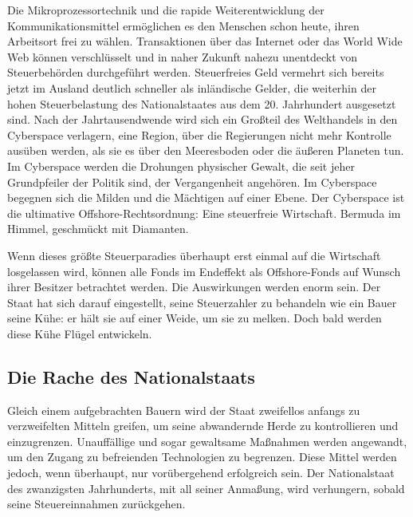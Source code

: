 \documentclass[
  a5paper,
  smalldemyvopaper,10pt,twoside,onecolumn,openright,extrafontsizes,hidelinks]{memoir}
\begin{document}
Die Mikroprozessortechnik und die rapide Weiterentwicklung der
Kommunikationsmittel ermöglichen es den Menschen schon heute, ihren
Arbeitsort frei zu wählen. Transaktionen über das Internet oder das
World Wide Web können verschlüsselt und in naher Zukunft nahezu
unentdeckt von Steuerbehörden durchgeführt werden. Steuerfreies Geld
vermehrt sich bereits jetzt im Ausland deutlich schneller als
inländische Gelder, die weiterhin der hohen Steuerbelastung des
Nationalstaates aus dem 20. Jahrhundert ausgesetzt sind. Nach der
Jahrtausendwende wird sich ein Großteil des Welthandels in den
Cyberspace verlagern, eine Region, über die Regierungen nicht mehr
Kontrolle ausüben werden, als sie es über den Meeresboden oder die
äußeren Planeten tun. Im Cyberspace werden die Drohungen physischer
Gewalt, die seit jeher Grundpfeiler der Politik sind, der Vergangenheit
angehören. Im Cyberspace begegnen sich die Milden und die Mächtigen auf
einer Ebene. Der Cyberspace ist die ultimative Offshore-Rechtsordnung:
Eine steuerfreie Wirtschaft. Bermuda im Himmel, geschmückt mit
Diamanten.

Wenn dieses größte Steuerparadies überhaupt erst einmal auf die
Wirtschaft losgelassen wird, können alle Fonds im Endeffekt als
Offshore-Fonds auf Wunsch ihrer Besitzer betrachtet werden. Die
Auswirkungen werden enorm sein. Der Staat hat sich darauf eingestellt,
seine Steuerzahler zu behandeln wie ein Bauer seine Kühe: er hält sie
auf einer Weide, um sie zu melken. Doch bald werden diese Kühe Flügel
entwickeln.

\subsection{Die Rache des
Nationalstaats}\label{die-rache-des-nationalstaats}

Gleich einem aufgebrachten Bauern wird der Staat zweifellos anfangs zu
verzweifelten Mitteln greifen, um seine abwandernde Herde zu
kontrollieren und einzugrenzen. Unauffällige und sogar gewaltsame
Maßnahmen werden angewandt, um den Zugang zu befreienden Technologien zu
begrenzen. Diese Mittel werden jedoch, wenn überhaupt, nur vorübergehend
erfolgreich sein. Der Nationalstaat des zwanzigsten Jahrhunderts, mit
all seiner Anmaßung, wird verhungern, sobald seine Steuereinnahmen
zurückgehen.
\end{document}
